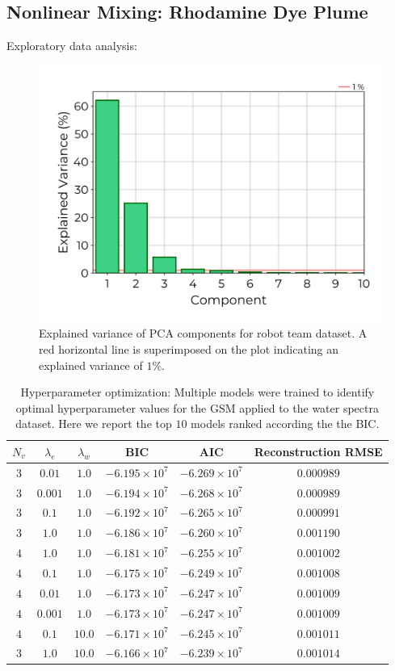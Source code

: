 \documentclass[remotesensing,article,submit,pdftex,moreauthors]{Definitions/mdpi}
\begin{document}
\subsection{Nonlinear Mixing: Rhodamine Dye Plume}

Exploratory data analysis: 
\begin{figure}[H]
\includegraphics[width=0.60\columnwidth]{results/robot-team/pca-variance.png}
\caption{Explained variance of PCA components for robot team dataset. A red horizontal line is superimposed on the plot indicating an explained variance of $1\%$. \label{fig:robot-team-pca}}
\end{figure}  

\begin{table}[H] 
\caption{Hyperparameter optimization: Multiple models were trained to identify optimal hyperparameter values for the GSM applied to the water spectra dataset. Here we report the top $10$ models ranked according the the BIC.}
\label{table:fit-comparison}
\begin{tabularx}{\textwidth}{CCCCCC}
\toprule
\textbf{$N_v$}	& \textbf{$\lambda_e$}	& \textbf{$\lambda_w$} & \textbf{BIC} & \textbf{AIC} & \textbf{Reconstruction RMSE}\\
\midrule
$3$ & $0.01$    & $1.0$     & $-6.195\times10^7$   & $-6.269\times10^7$   & $0.000989$ \\
$3$	& $0.001$   & $1.0$     & $-6.194\times10^7$   & $-6.268\times10^7$   & $0.000989$ \\
$3$	& $0.1$     & $1.0$	    & $-6.192\times10^7$   & $-6.265\times10^7$   & $0.000991$ \\
$3$	& $1.0$     & $1.0$	    & $-6.186\times10^7$   & $-6.260\times10^7$   & $0.001190$ \\
$4$	& $1.0$     & $1.0$	    & $-6.181\times10^7$   & $-6.255\times10^7$   & $0.001002$ \\
$4$	& $0.1$     & $1.0$	    & $-6.175\times10^7$   & $-6.249\times10^7$   & $0.001008$ \\
$4$	& $0.01$    & $1.0$     & $-6.173\times10^7$   & $-6.247\times10^7$   & $0.001009$ \\ 
$4$	& $0.001$   & $1.0$     & $-6.173\times10^7$   & $-6.247\times10^7$   & $0.001009$ \\
$4$	& $0.1$     & $10.0$    & $-6.171\times10^7$   & $-6.245\times10^7$   & $0.001011$ \\
$3$	& $1.0$     & $10.0$    & $-6.166\times10^7$   & $-6.239\times10^7$   & $0.001014$ \\
\bottomrule
\end{tabularx}
\end{table}
\end{document}
